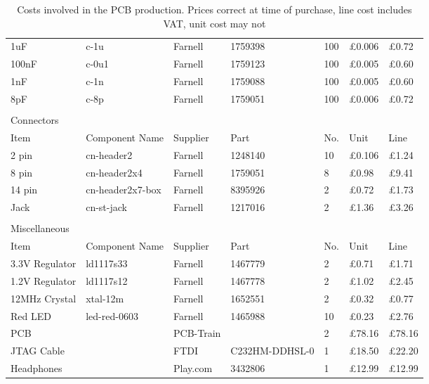 \begin{table}[H]
\begin{tabular}[c]{| l | l | l | p{50px} | l | l | l |}
		1uF	& c-1u	& Farnell	& 1759398	& 100	& \pounds0.006	& \pounds0.72	\\
		100nF	& c-0u1	& Farnell	& 1759123	& 100	& \pounds0.005	& \pounds0.60	\\
		1nF	& c-1n	& Farnell	& 1759088	& 100	& \pounds0.005	& \pounds0.60	\\
		8pF	& c-8p	& Farnell	& 1759051	& 100	& \pounds0.006	& \pounds0.72	\\
		\hline
		\multicolumn{7}{|l|}{}\\
		\hline
		\multicolumn{7}{|l|}{Connectors} \\
		\hline
		Item	& Component Name& Supplier & Part	& No.	& Unit  & Line \\
		\hline
		2 pin	& cn-header2	& Farnell	& 1248140	& 10	& \pounds0.106	& \pounds1.24	\\
		8 pin	& cn-header2x4	& Farnell	& 1759051	& 8	& \pounds0.98	& \pounds9.41	\\
		14 pin	& cn-header2x7-box	& Farnell	& 8395926	& 2	& \pounds0.72	& \pounds1.73	\\
		Jack	& cn-st-jack	& Farnell	& 1217016	& 2	& \pounds1.36	& \pounds3.26	\\
		\hline
		\multicolumn{7}{|l|}{}\\
		\hline
		\multicolumn{7}{|l|}{Miscellaneous} \\
		\hline
		Item	& Component Name& Supplier & Part	& No.	& Unit  & Line \\
		\hline
		3.3V Regulator	& ld1117s33	& Farnell	& 1467779	& 2	& \pounds0.71	& \pounds1.71	\\
		1.2V Regulator	& ld1117s12	& Farnell	& 1467778	& 2	& \pounds1.02	& \pounds2.45	\\
		12MHz Crystal	& xtal-12m	& Farnell	& 1652551	& 2	& \pounds0.32	& \pounds0.77	\\
		Red LED		& led-red-0603	& Farnell	& 1465988	& 10	& \pounds0.23	& \pounds2.76	\\
		PCB		&	 	& PCB-Train	& 		& 2	& \pounds78.16	& \pounds78.16	\\
		JTAG Cable	&		& FTDI		& C232HM-DDHSL-0& 1	& \pounds18.50	& \pounds22.20	\\
		Headphones	&		& Play.com	& 3432806	& 1	& \pounds12.99	& \pounds12.99	\\
		\hline
	\end{tabular}
	\caption{Costs involved in the PCB production. Prices correct at time of purchase, line cost includes VAT, unit cost may not}
	\label{tab:pcbcostings}
\end{table}
